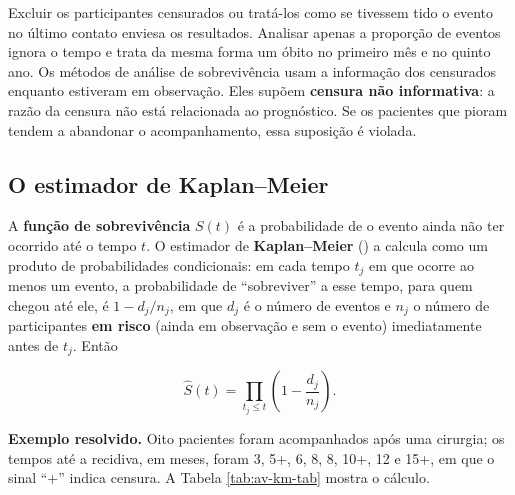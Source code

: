 \documentclass[
]{book}
\begin{document}
Excluir os participantes censurados ou tratá-los como se tivessem tido o evento no último contato enviesa os resultados. Analisar apenas a proporção de eventos ignora o tempo e trata da mesma forma um óbito no primeiro mês e no quinto ano. Os métodos de análise de sobrevivência usam a informação dos censurados enquanto estiveram em observação. Eles supõem \textbf{censura não informativa}: a razão da censura não está relacionada ao prognóstico. Se os pacientes que pioram tendem a abandonar o acompanhamento, essa suposição é violada.

\subsection{O estimador de Kaplan--Meier}\label{o-estimador-de-kaplanmeier}

A \textbf{função de sobrevivência} \(S(t)\) é a probabilidade de o evento ainda não ter ocorrido até o tempo \(t\). O estimador de \textbf{Kaplan--Meier} () a calcula como um produto de probabilidades condicionais: em cada tempo \(t_j\) em que ocorre ao menos um evento, a probabilidade de ``sobreviver'' a esse tempo, para quem chegou até ele, é \(1 - d_j/n_j\), em que \(d_j\) é o número de eventos e \(n_j\) o número de participantes \textbf{em risco} (ainda em observação e sem o evento) imediatamente antes de \(t_j\). Então

\[
\hat{S}(t) = \prod_{t_j \le t}\left(1 - \frac{d_j}{n_j}\right).
\]

\textbf{Exemplo resolvido.} Oito pacientes foram acompanhados após uma cirurgia; os tempos até a recidiva, em meses, foram 3, 5+, 6, 8, 8, 10+, 12 e 15+, em que o sinal ``+'' indica censura. A Tabela \ref{tab:av-km-tab} mostra o cálculo.

\begin{table}

\caption{\label{tab:av-km-tab}Cálculo do estimador de Kaplan–Meier para oito pacientes.}
\centering
{}
\end{table}
\end{document}
